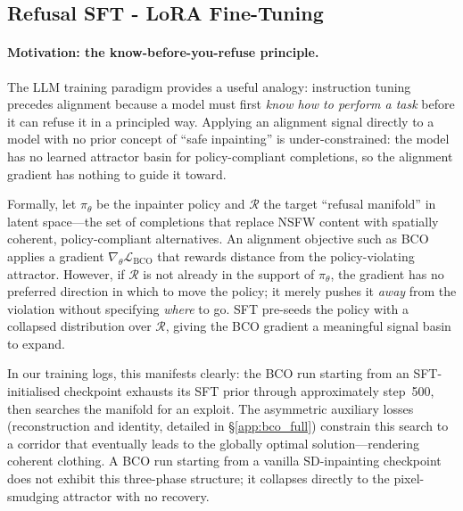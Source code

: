 \subsection{Refusal SFT - LoRA Fine-Tuning}
\label{app:sft}

\paragraph{Motivation: the know-before-you-refuse principle.}
The LLM training paradigm provides a useful analogy: instruction tuning
precedes alignment because a model must first \emph{know how to perform a
task} before it can refuse it in a principled way.
Applying an alignment signal directly to a model with no prior concept of
``safe inpainting'' is under-constrained: the model has no learned attractor
basin for policy-compliant completions, so the alignment gradient has
nothing to guide it toward.

Formally, let $\pi_\theta$ be the inpainter policy and $\mathcal{R}$ the
target ``refusal manifold'' in latent space---the set of completions that
replace NSFW content with spatially coherent, policy-compliant alternatives.
An alignment objective such as BCO applies a gradient
$\nabla_\theta \mathcal{L}_\text{BCO}$ that rewards distance from the
policy-violating attractor.
However, if $\mathcal{R}$ is not already in the support of $\pi_\theta$,
the gradient has no preferred direction in which to move the policy; it
merely pushes it \emph{away} from the violation without specifying
\emph{where} to go.
SFT pre-seeds the policy with a collapsed distribution over $\mathcal{R}$,
giving the BCO gradient a meaningful signal basin to expand.

In our training logs, this manifests clearly: the BCO run starting from an
SFT-initialised checkpoint exhausts its SFT prior through approximately
step~500, then searches the manifold for an exploit.
The asymmetric auxiliary losses (reconstruction and identity, detailed
in \S\ref{app:bco_full}) constrain this search to a corridor that
eventually leads to the globally optimal solution---rendering coherent
clothing.
A BCO run starting from a vanilla SD-inpainting checkpoint does not exhibit
this three-phase structure; it collapses directly to the pixel-smudging
attractor with no recovery.


